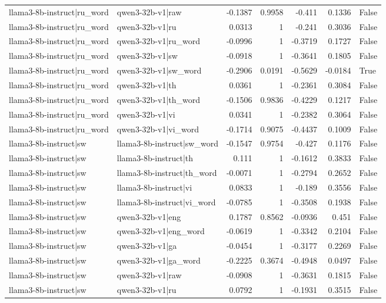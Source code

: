 \begin{table}
\begin{tabular}{l l r r r r l}
llama3-8b-instruct|ru_word & qwen3-32b-v1|raw & -0.1387 & 0.9958 & -0.411 & 0.1336 & False \\
llama3-8b-instruct|ru_word & qwen3-32b-v1|ru & 0.0313 & 1 & -0.241 & 0.3036 & False \\
llama3-8b-instruct|ru_word & qwen3-32b-v1|ru_word & -0.0996 & 1 & -0.3719 & 0.1727 & False \\
llama3-8b-instruct|ru_word & qwen3-32b-v1|sw & -0.0918 & 1 & -0.3641 & 0.1805 & False \\
llama3-8b-instruct|ru_word & qwen3-32b-v1|sw_word & -0.2906 & 0.0191 & -0.5629 & -0.0184 & True \\
llama3-8b-instruct|ru_word & qwen3-32b-v1|th & 0.0361 & 1 & -0.2361 & 0.3084 & False \\
llama3-8b-instruct|ru_word & qwen3-32b-v1|th_word & -0.1506 & 0.9836 & -0.4229 & 0.1217 & False \\
llama3-8b-instruct|ru_word & qwen3-32b-v1|vi & 0.0341 & 1 & -0.2382 & 0.3064 & False \\
llama3-8b-instruct|ru_word & qwen3-32b-v1|vi_word & -0.1714 & 0.9075 & -0.4437 & 0.1009 & False \\
llama3-8b-instruct|sw & llama3-8b-instruct|sw_word & -0.1547 & 0.9754 & -0.427 & 0.1176 & False \\
llama3-8b-instruct|sw & llama3-8b-instruct|th & 0.111 & 1 & -0.1612 & 0.3833 & False \\
llama3-8b-instruct|sw & llama3-8b-instruct|th_word & -0.0071 & 1 & -0.2794 & 0.2652 & False \\
llama3-8b-instruct|sw & llama3-8b-instruct|vi & 0.0833 & 1 & -0.189 & 0.3556 & False \\
llama3-8b-instruct|sw & llama3-8b-instruct|vi_word & -0.0785 & 1 & -0.3508 & 0.1938 & False \\
llama3-8b-instruct|sw & qwen3-32b-v1|eng & 0.1787 & 0.8562 & -0.0936 & 0.451 & False \\
llama3-8b-instruct|sw & qwen3-32b-v1|eng_word & -0.0619 & 1 & -0.3342 & 0.2104 & False \\
llama3-8b-instruct|sw & qwen3-32b-v1|ga & -0.0454 & 1 & -0.3177 & 0.2269 & False \\
llama3-8b-instruct|sw & qwen3-32b-v1|ga_word & -0.2225 & 0.3674 & -0.4948 & 0.0497 & False \\
llama3-8b-instruct|sw & qwen3-32b-v1|raw & -0.0908 & 1 & -0.3631 & 0.1815 & False \\
llama3-8b-instruct|sw & qwen3-32b-v1|ru & 0.0792 & 1 & -0.1931 & 0.3515 & False \\

\end{tabular}
\end{table}
